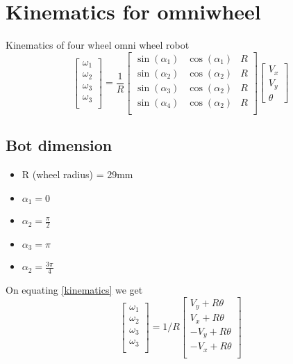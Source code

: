 \documentclass[a4paper]{article}
\begin{document}
    \section{Kinematics for omniwheel }
    Kinematics of four wheel omni wheel robot
    \begin{equation}\label{kinematics}
        \begin{bmatrix} 
            \omega_1 \\
            \omega_2 \\
            \omega_3 \\
            \omega_3 \\
        \end{bmatrix} 
        =\frac{1}{R}
        \begin{bmatrix} 
            \sin(\alpha_1) & \cos(\alpha_1) & R \\
            \sin(\alpha_2) & \cos(\alpha_2) & R \\
            \sin(\alpha_3) & \cos(\alpha_2) & R \\
            \sin(\alpha_4) & \cos(\alpha_2) & R \\
        \end{bmatrix} 
        \begin{bmatrix} 
            V_x \\ 
            V_y \\ 
            \theta
        \end{bmatrix} 
    \end{equation}
    \subsection{Bot dimension}
    \begin{itemize}
        \item R (wheel radius) = 29mm
        \item $\alpha_1 = 0 $
        \item $\alpha_2 = \frac{\pi}{2} $
        \item $\alpha_3 = \pi $
        \item $\alpha_2 = \frac{3\pi}{4} $
    \end{itemize}
    On equating \ref{kinematics} we get
    \begin{equation}
        \begin{bmatrix} 
            \omega_1 \\
            \omega_2 \\
            \omega_3 \\
            \omega_3 \\
        \end{bmatrix} 
        = 1/R \begin{bmatrix}  
        V_y + R \theta \\
        V_x + R \theta \\
        -V_y + R \theta \\
        -V_x + R \theta \\
        \end{bmatrix} 
    \end{equation}
\end{document}
